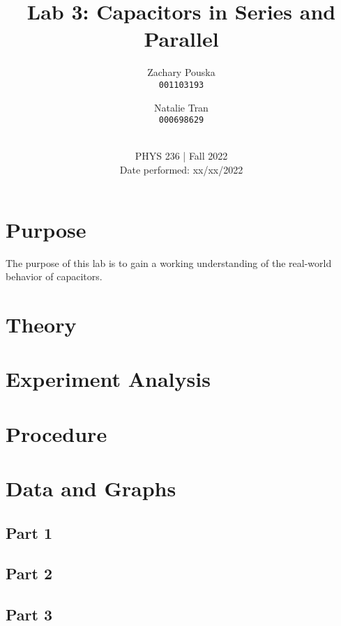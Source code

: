 \documentclass[titlepage]{article}
\begin{document}
\title{\textbf{Lab 3: Capacitors in Series and Parallel}}
\author{
    Zachary Pouska\\
    \texttt{001103193}\\
    \and
    Natalie Tran \\ 
    \texttt{000698629}\\ \\
} 

\date{PHYS 236 | Fall 2022\\
Date performed: xx/xx/2022}


	\maketitle



	\section{Purpose}
    The purpose of this lab is to gain a working understanding of the real-world behavior of capacitors. 

	\section{Theory}	



	\section{Experiment Analysis}
    



	\section{Procedure}




	\section{Data and Graphs}
	    \subsection{Part 1}
	    \subsection{Part 2} 
	    \subsection{Part 3}
\end{document}
